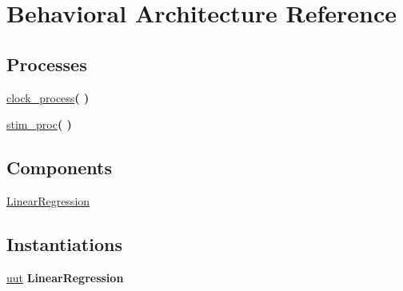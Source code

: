\hypertarget{classtb___linear_regression_1_1_behavioral}{\section{Behavioral Architecture Reference}
\label{classtb___linear_regression_1_1_behavioral}
}
\subsection*{Processes}
 \begin{DoxyCompactItemize}
\item 
\hyperlink{classtb___linear_regression_1_1_behavioral_ac0731c1f0a226305f2a590b4044cdccb}{clock\+\_\+process}{\bfseries  (  )}
\item 
\hyperlink{classtb___linear_regression_1_1_behavioral_ad2efa6785cff833c341e27596b21aeb5}{stim\+\_\+proc}{\bfseries  (  )}
\end{DoxyCompactItemize}
\subsection*{Components}
 \begin{DoxyCompactItemize}
\item 
\hyperlink{classtb___linear_regression_1_1_behavioral_a899499ba78b32b936cd0914831a72c95}{Linear\+Regression}  {\bfseries }  
\end{DoxyCompactItemize}
\subsection*{Instantiations}
 \begin{DoxyCompactItemize}
\item 
\hyperlink{classtb___linear_regression_1_1_behavioral_a1619316ad715601eb5d3559db829ac05}{uut}  {\bfseries Linear\+Regression}   
\end{DoxyCompactItemize}


